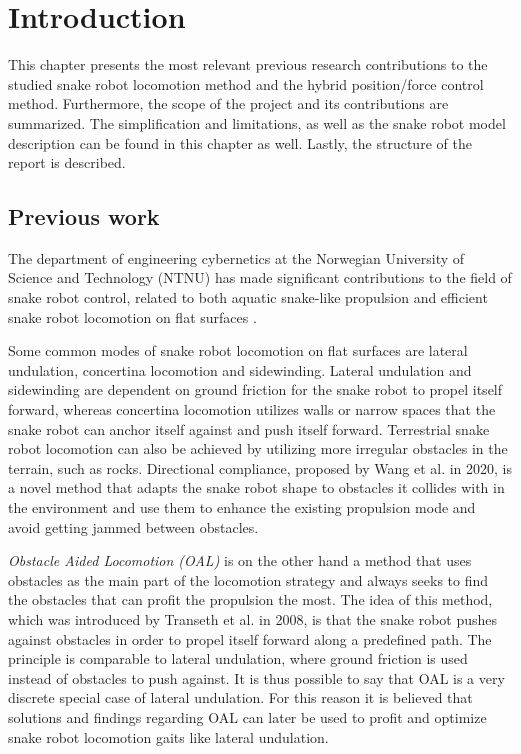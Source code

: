 
\chapter{Introduction}\label{Chapter:introduction}

This chapter presents the most relevant previous research contributions to the studied snake robot locomotion method and the hybrid position/force control method. Furthermore, the scope of the project and its contributions are summarized. The simplification and limitations, as well as the snake robot model description can be found in this chapter as well. Lastly, the structure of the report is described.

\section{Previous work}

The department of engineering cybernetics at the Norwegian University of Science and Technology (NTNU) has made significant contributions to the field of snake robot control, related to both aquatic snake-like propulsion and efficient snake robot locomotion on flat surfaces \cite{StavdahlNote}.

Some common modes of snake robot locomotion on flat surfaces are lateral undulation, concertina locomotion and sidewinding. Lateral undulation and sidewinding are dependent on ground friction for the snake robot to propel itself forward, whereas concertina locomotion utilizes walls or narrow spaces that the snake robot can anchor itself against and push itself forward. Terrestrial snake robot locomotion can also be achieved by utilizing more irregular obstacles in the terrain, such as rocks. Directional compliance, proposed by Wang et al. \cite{wang2020directional} in 2020, is a novel method that adapts the snake robot shape to obstacles it collides with in the environment and use them to enhance the existing propulsion mode and avoid getting jammed between obstacles.

\textit{Obstacle Aided Locomotion (OAL)} is on the other hand a method that uses obstacles as the main part of the locomotion strategy and always seeks to find the obstacles that can profit the propulsion the most. The idea of this method, which was introduced by Transeth et al. \cite{transeth2008snake} in 2008, is that the snake robot pushes against obstacles in order to propel itself forward along a predefined path. The principle is comparable to lateral undulation, where ground friction is used instead of obstacles to push against. It is thus possible to say that OAL is a very discrete special case of lateral undulation. For this reason it is believed that solutions and findings regarding OAL can later be used to profit and optimize snake robot locomotion gaits like lateral undulation.


